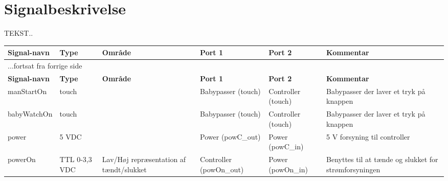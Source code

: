 

\section{Signalbeskrivelse}
TEKST..

\begin{center}
\label{table:Signaltabel}
\begin{longtable}{|p{2cm}|p{2cm}|p{2cm}|p{2cm}|p{2cm}|p{}|}
\hline
\textbf{Signal-navn}	&\textbf{Type} 		&\textbf{Område} &\textbf{Port 1} 	&\textbf{Port 2} 			&\textbf{Kommentar} \\ \hline
\endfirsthead
\multicolumn{5}{l}{...fortsat fra forrige side} \\ \hline 
\textbf{Signal-navn}	&\textbf{Type} 		&\textbf{Område} &\textbf{Port 1} 	&\textbf{Port 2} 			&\textbf{Kommentar} \\ \hline
\endhead


manStartOn
&touch
&
&Babypasser \newline (touch)
&Controller \newline (touch)
&Babypasser der laver et tryk på knappen
\\\hline

babyWatchOn
&touch
&
&Babypasser \newline (touch)
&Controller \newline (touch)
&Babypasser der laver et tryk på knappen
\\\hline

power
&5 VDC
&
&Power \newline(powC\_out)
&Power \newline(powC\_in)
&5 V forsyning til controller
\\\hline

powerOn			
&TTL 0-3,3 VDC				
&Lav/Høj repræsentation af tændt/slukket 
&Controller (powOn\_out) 			
&Power (powOn\_in)	
&Benyttes til at tænde og slukket for strømforsyningen   				\\\hline

\end{longtable}
\end{center}